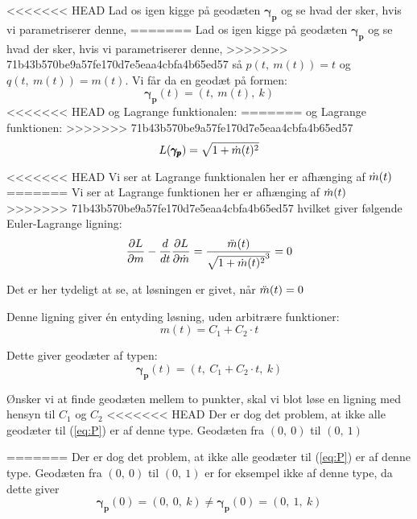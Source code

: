 <<<<<<< HEAD
Lad os igen kigge på geodæten \(\pmb{\gamma_p}\) og se hvad der sker, hvis vi parametriserer denne,
=======
Lad os igen kigge på geodæten \(\pmb{\gamma_p}\) og se hvad der sker,
hvis vi parametriserer denne,
>>>>>>> 71b43b570be9a57fe170d7e5eaa4cbfa4b65ed57
så \(p(t,~m(t) ) = t\) og \(q(t,~m(t) ) = m(t)\).
Vi får da en geodæt på formen:
\begin{equation*}
\pmb{\gamma_p}(t) = (t,~m(t),~k)
\end{equation*}
%
<<<<<<< HEAD
og Lagrange funktionalen:
=======
og Lagrange funktionen:
>>>>>>> 71b43b570be9a57fe170d7e5eaa4cbfa4b65ed57
\begin{equation*}
L(\pmb{\gamma_p}) = \sqrt{ 1 + \dot{m}(t)^2 }
\end{equation*}

<<<<<<< HEAD
Vi ser at Lagrange funktionalen her er afhænging af \(\dot{m}(t)\) 
=======
Vi ser at Lagrange funktionen her er afhænging af \(\dot{m}(t)\) 
>>>>>>> 71b43b570be9a57fe170d7e5eaa4cbfa4b65ed57
hvilket giver følgende Euler-Lagrange ligning:
\begin{equation*}
\frac{\partial L}{\partial m} - \frac{d}{d t} \frac{\partial L}{\partial \dot{m}} = 
\frac{\ddot{m}(t)}{\sqrt{1 + \dot{m}(t)^2}^3} = 0\\
\end{equation*}

Det er her tydeligt at se, at løsningen er givet, når \(\ddot{m}(t) = 0\)

Denne ligning giver én entyding løsning, uden arbitrære funktioner:
\begin{equation*}
m(t) = C_1 + C_2 \cdot t
\end{equation*}

Dette giver geodæter af typen:
\begin{equation*}
\pmb{\gamma_p}(t) = (t,~C_1 + C_2 \cdot t,~k)
\end{equation*}
 
 Ønsker vi at finde geodæten mellem to punkter, skal vi blot løse en ligning med hensyn til \(C_1\) og \(C_2\)
<<<<<<< HEAD
 Der er dog det problem, at ikke alle geodæter til (\ref{eq:P}) er af denne type. Geodæten fra \((0,~0)\) til \((0,~1)\)


=======
 Der er dog det problem, at ikke alle geodæter til (\ref{eq:P}) er af denne type.
 Geodæten fra \((0,~0)\) til \((0,~1)\) er for eksempel ikke af denne type, da dette giver
 \begin{equation*}
 \pmb{\gamma_p}(0) = (0,~0,~k) \neq  \pmb{\gamma_p}(0) = (0,~1,~k)
 \end{equation*}

